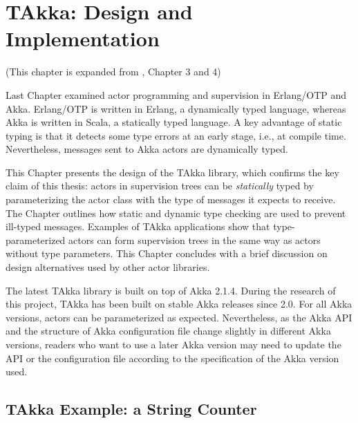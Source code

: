 \chapter{TAkka: Design and Implementation}
\label{takka_design}

\begin{center}
(This chapter is expanded from \citep{TAKKA_paper} , Chapter 3 and 4)
\end{center}
\vspace{12 pt}

Last Chapter examined actor programming and supervision in Erlang/OTP and Akka. 
 Erlang/OTP is written in Erlang, a dynamically typed language, whereas Akka is 
written in Scala, a statically typed language. A key advantage of static typing 
is that it detects some type errors at an early stage, i.e., at compile time.  
Nevertheless, messages sent to Akka actors are dynamically typed. 

\begin{comment}
because it was believed that 
type parameterized actors and supervision will be difficult
to work together [? private communication and mailing list question ?] .
\end{comment}

This Chapter presents the design of the TAkka library, which confirms the key 
claim of this thesis: actors in supervision trees can be 
{\it statically} typed by parameterizing the actor class with the type of 
messages it expects to receive.  The Chapter outlines how 
static and dynamic type checking are used to prevent ill-typed messages.  
Examples of TAkka applications show that type-parameterized actors can form 
supervision trees in the same way as actors without type parameters.  This 
Chapter concludes with a brief discussion on design alternatives used by 
other actor libraries.

The latest TAkka library is built on top of Akka 2.1.4.  During the research 
of this project, TAkka has been built on stable Akka releases since 2.0.  For 
all Akka versions, actors can be parameterized as expected.  
Nevertheless, as the Akka API and the structure of Akka configuration file change 
slightly in different Akka versions, readers who want to use a later Akka 
version may need to update the API or the configuration file according to the 
specification of the Akka version used.


\section{TAkka Example: a String Counter}
\label{sec:takka_example}

